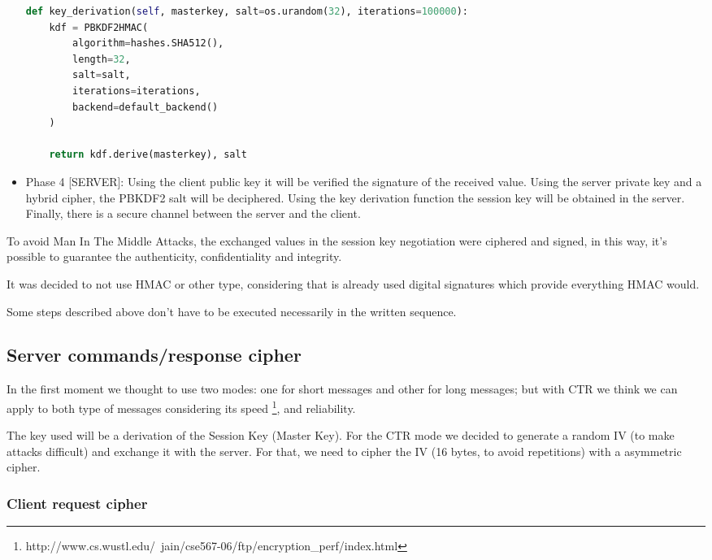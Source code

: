 \documentclass[pdftex,12pt,a4paper]{report}
\begin{document}
\begin{itemize}
\begin{lstlisting}[language=Python]
def key_derivation(self, masterkey, salt=os.urandom(32), iterations=100000):
    kdf = PBKDF2HMAC(
        algorithm=hashes.SHA512(),
        length=32,
        salt=salt,
        iterations=iterations,
        backend=default_backend()
    )
    
    return kdf.derive(masterkey), salt
\end{lstlisting}

    \item Phase 4 [SERVER]: Using the client public key it will be verified the signature of the received value. Using the server private key and a hybrid cipher, the PBKDF2 salt will be deciphered. Using the key derivation function the session key will be obtained in the server.
    Finally, there is a secure channel between the server and the client.

\end{itemize}

To avoid Man In The Middle Attacks, the exchanged values in the session key negotiation were ciphered and signed, in this way, it's possible to guarantee the authenticity, confidentiality and integrity.

It was decided to not use HMAC or other type, considering that is already used digital signatures which provide everything HMAC would.

Some steps described above don't have to be executed necessarily in the written sequence.

\subsection{Server commands/response cipher}

In the first moment we thought to use two modes: one for short messages and other for long messages; but with CTR we think we can apply to both type of messages considering its speed  \footnote{http://www.cs.wustl.edu/~jain/cse567-06/ftp/encryption_perf/index.html}, and reliability.

The key used will be a derivation of the Session Key (Master Key). For the CTR mode we decided to generate a random IV (to make attacks difficult) and exchange it with the server. For that, we need to cipher the IV (16 bytes, to avoid repetitions) with a asymmetric cipher.

\subsubsection{Client request cipher}
\end{document}
